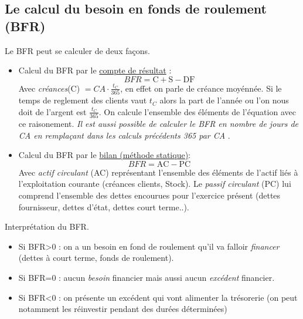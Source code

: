 \documentclass[12pt,oneside,a4paper]{article}
\begin{document}

\subsection{Le calcul du besoin en fonds de roulement (BFR)} %
\label{sub:le_calcul_du_besoin_en_fonds_de_roulement_bfr}

Le BFR peut se calculer de deux façons. 

\begin{itemize}[label=]

	\item Calcul du BFR par le \underline{compte de résultat} : 
	\[
		BFR= \text{C}+ \text{S}-\text{DF}
	\]
	Avec \emph{créances}(C) $=CA\cdot\frac{t_{C}}{365}$, en effet on parle de créance moyénnée. Si le temps de reglement des clients vaut $t_{C}$ alors la part de l'année ou l'on nous doit de l'argent est $\frac{t_{C}}{365}$. On calcule l'ensemble des éléments de l'équation avec ce raisonement. \emph{Il est aussi possible de calculer le BFR en nombre de jours de CA en remplaçant dans les calculs précédents 365 par CA }.

	\item Calcul du BFR par le \underline{bilan (méthode statique)}: 
	\[
		BFR= \text{AC}-\text{PC}
	\]
	Avec \emph{actif circulant} (AC) représentant l'ensemble des éléments de l'actif liés à l'exploitation courante (créances clients, Stock). Le \emph{passif circulant} (PC) lui comprend l'ensemble des dettes encourues pour l'exercice présent (dettes fournisseur, dettes d'état, dettes court terme..).

\end{itemize}

Interprétation du BFR.

\begin{itemize}[label=]

	\item Si BFR>0 : on a un besoin en fond de roulement qu'il va falloir \emph{financer} (dettes à court terme, fonds de roulement).

	\item Si BFR=0 : aucun \emph{besoin} financier mais aussi aucun \emph{excédent} financier.

	\item Si BFR<0 : on présente un excédent qui vont alimenter la trésorerie (on peut notamment les réinvestir pendant des durées déterminées)

\end{itemize}
\end{document}

